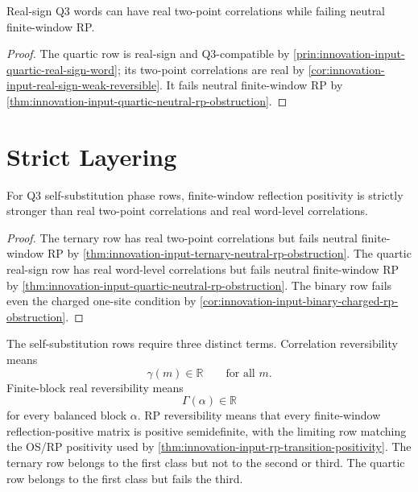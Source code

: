 \begin{corollary}
\label{cor:innovation-input-real-sign-not-rp}
Real-sign Q3 words can have real two-point correlations while failing
neutral finite-window RP.
\end{corollary}

\begin{proof}
The quartic row is real-sign and Q3-compatible by
\autoref{prin:innovation-input-quartic-real-sign-word}; its two-point
correlations are real by
\autoref{cor:innovation-input-real-sign-weak-reversible}. It fails neutral
finite-window RP by \autoref{thm:innovation-input-quartic-neutral-rp-obstruction}.
\end{proof}

\section{Strict Layering}
\label{sec:innovation-input-finite-window-rp-layering}

\begin{theorem}
\label{thm:innovation-input-self-substitution-reversibility-layers}
For Q3 self-substitution phase rows, finite-window reflection positivity is
strictly stronger than real two-point correlations and real word-level
correlations.
\end{theorem}

\begin{proof}
The ternary row has real two-point correlations but fails neutral
finite-window RP by
\autoref{thm:innovation-input-ternary-neutral-rp-obstruction}. The quartic
real-sign row has real word-level correlations but fails neutral
finite-window RP by
\autoref{thm:innovation-input-quartic-neutral-rp-obstruction}. The binary
row fails even the charged one-site condition by
\autoref{cor:innovation-input-binary-charged-rp-obstruction}.
\end{proof}

\begin{principle}
\label{prin:innovation-input-rp-terminology-separation}
The self-substitution rows require three distinct terms. Correlation
reversibility means
$$
\gamma(m)\in\mathbb R
\qquad
\text{for all }m.
$$
Finite-block real reversibility means
$$
\Gamma(\alpha)\in\mathbb R
$$
for every balanced block $\alpha$. RP reversibility means that every
finite-window reflection-positive matrix is positive semidefinite, with
the limiting row matching the OS/RP positivity used by
\autoref{thm:innovation-input-rp-transition-positivity}. The ternary row
belongs to the first class but not to the second or third. The quartic row
belongs to the first class but fails the third.
\end{principle}

